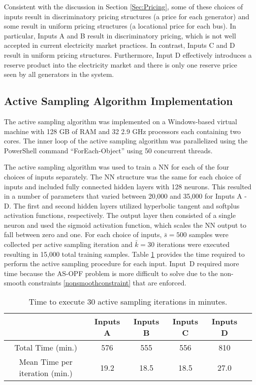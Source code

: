 \documentclass[lettersize,journal]{IEEEtran}
\begin{document}
Consistent with the discussion in Section \ref{Sec:Pricing}, some of these choices of inputs result in discriminatory pricing structures (a price for each generator) and some result in uniform pricing structures (a locational price for each bus).  In particular, Inputs A and B result in discriminatory pricing, which is not well accepted in current electricity market practices.  In contrast, Inputs C and D result in uniform pricing structures.  Furthermore, Input D effectively introduces a reserve product into the electricity market and there is only one reserve price seen by all generators in the system. 


\subsection{Active Sampling Algorithm Implementation}\label{sec:ASdetails}
The active sampling algorithm was implemented on a Windows-based virtual machine with 128 GB of RAM and 32 2.9 GHz processors each containing two cores.  The inner loop of the active sampling algorithm was parallelized using the PowerShell command ``ForEach-Object'' using 50 concurrent threads. 

The active sampling algorithm was used to train a NN for each of the four choices of inputs separately.  The NN structure was the same for each choice of inputs and included fully connected hidden layers with 128 neurons.  This resulted in a number of parameters that varied between 20,000 and 35,000 for Inputs A - D.  The first and second hidden layers utilized hyperbolic tangent and softplus activation functions, respectively.  The output layer then consisted of a single neuron and used the sigmoid activation function, which scales the NN output to fall between zero and one.  For each choice of inputs, $\bar{s}=500$ samples were collected per active sampling iteration and $\bar{k}=30$ iterations were executed resulting in 15,000 total training samples.  Table \ref{ASTable} provides the time required to perform the active sampling procedure for each input.  Input~D required more time because the AS-OPF problem is more difficult to solve due to the non-smooth constraints \eqref{nonsmoothconstraint} that are enforced.  
\setlength{\tabcolsep}{3pt} %
\renewcommand{\arraystretch}{1.3} %
\begin{table}[h!]
\vspace{-2pt}
\caption[]{\label{ASTable} Time to execute 30 active sampling iterations in minutes.}
\vspace{-15pt}
\begin{center}
\begin{tabular}{|c|c|c|c|c|c|} 
	\hline
	&Inputs A&Inputs B&Inputs C&Inputs D\\
	\hline
	Total Time (min.)&576&555&556&810\\
	\hline
	Mean Time per iteration (min.)&19.2&18.5&18.5&27.0\\
	\hline
\end{tabular}
\end{center}
\end{table}
\end{document}
